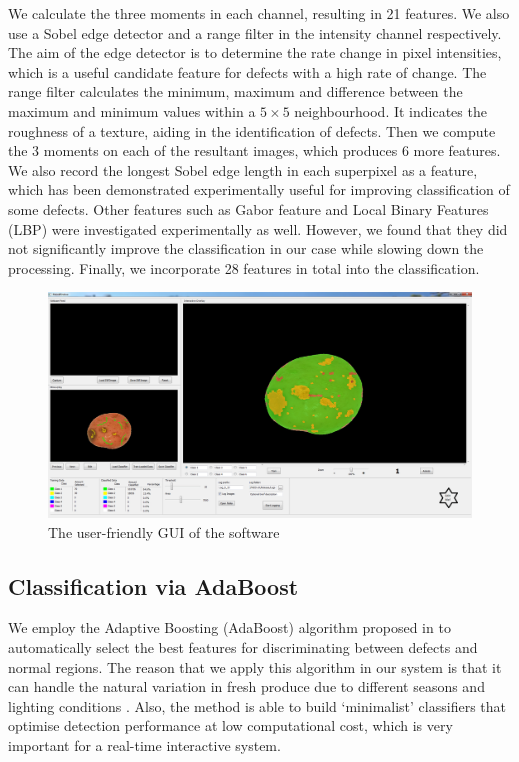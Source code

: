 \documentclass[twocolumn]{svjour3}          %
\begin{document}
We calculate the three moments in each channel, resulting in 21 features. We also use a Sobel edge detector and a range filter in the intensity channel respectively. The aim of the edge detector is to determine the rate change in pixel intensities, which is a useful candidate feature for defects with a high rate of change. The range filter calculates the minimum, maximum and difference between the maximum and minimum values within a $5 \times 5$ neighbourhood. It indicates the roughness of a texture, aiding in the identification of defects. Then we compute the 3 moments on each of the resultant images, which produces 6 more features. We also record the longest Sobel edge length in each superpixel as a feature, which has been demonstrated experimentally useful for improving classification of some defects. Other features such as Gabor feature \cite{BM96} and Local Binary Features (LBP) \cite{OT02} were investigated experimentally as well. However, we found that they did not significantly improve the classification in our case while slowing down the processing. Finally, we incorporate 28 features in total into the classification. 
\begin{figure} [t]
\centering
\includegraphics[width=0.96\linewidth]{gui.jpg}
\caption{The user-friendly GUI of the software}
\label{fig:gui}
\end{figure}

\subsection{Classification via AdaBoost}
We employ the Adaptive Boosting (AdaBoost) algorithm proposed in \cite{BM10} to automatically select the best features for discriminating between defects and normal regions. The reason that we apply this algorithm in our system is that it can handle the natural variation in fresh produce due to different seasons and lighting conditions \cite{BM10}. Also, the method is able to build `minimalist' classifiers that optimise detection performance at low computational cost, which is very important for a real-time interactive system. 
\end{document}
